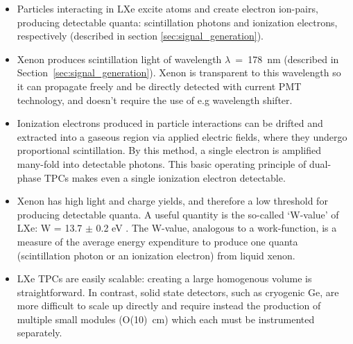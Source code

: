 \begin{itemize}
  \item Particles interacting in \ac{LXe} excite atoms and create electron ion-pairs, producing detectable quanta: scintillation photons and ionization electrons, respectively (described in section \ref{sec:signal_generation}).
  
  \item Xenon produces scintillation light of wavelength $\lambda$~=~178~nm (described in Section~\ref{sec:signal_generation}). Xenon is transparent to this wavelength so it can propagate freely and be directly detected with current \ac{PMT} technology, and doesn't require the use of e.g wavelength shifter. 
  
  \item Ionization electrons produced in particle interactions can be drifted and extracted into a gaseous region via applied electric fields, where they undergo proportional scintillation. By this method, a single electron is amplified many-fold into detectable photons. This basic operating principle of dual-phase \ac{TPC}s makes even a single ionization electron detectable. 
  
  \item Xenon has high light and charge yields, and therefore a low threshold for producing detectable quanta. A useful quantity is the so-called `W-value' of \ac{LXe}: W = 13.7 $\pm$ 0.2 eV \cite{Dahl2009}. The W-value, analogous to a work-function, is a measure of the average energy expenditure to produce one quanta (scintillation photon or an ionization electron) from liquid xenon. 
  
  \item \ac{LXe} \ac{TPC}s are easily scalable: creating a large homogenous volume is straightforward. In contrast, solid state detectors, such as cryogenic Ge, are more difficult to scale up directly and require instead the production of multiple small modules (O(10)~cm) which each must be instrumented separately.  
    
\end{itemize}


